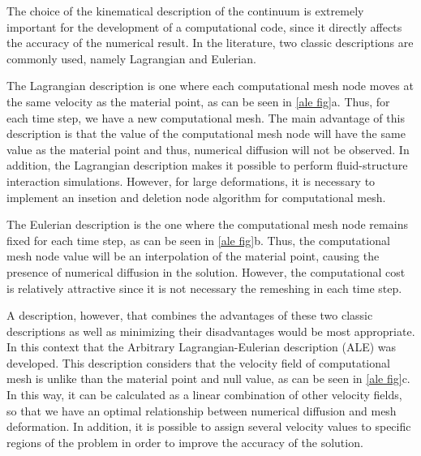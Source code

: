 The choice of the kinematical description of the continuum is 
extremely important for the development of a computational code, 
since it directly affects the accuracy of the numerical result. 
In the literature, two classic descriptions are commonly used, 
namely Lagrangian and Eulerian.

\medskip
The Lagrangian description is one where each computational mesh node 
moves at the same velocity as the material point, as can be seen in
\ref{ale fig}a. Thus, for each time step, we have a new computational mesh. 
The main advantage of this description is that the value of the 
computational mesh node will have the same value as the material point
 and thus, numerical diffusion will not be observed. In addition, 
the Lagrangian description makes it possible to perform 
fluid-structure interaction simulations. However, for large 
deformations, it is necessary to implement an insetion and deletion
node algorithm for computational mesh.

\medskip
The Eulerian description is the one where the computational mesh node 
remains fixed for each time step, as can be seen in \ref{ale fig}b.
Thus, the computational mesh node value will be an interpolation 
of the material point, causing the presence of numerical diffusion 
in the solution. However, the computational cost is relatively 
attractive since it is not necessary the remeshing in each time step.

\medskip
A description, however, that combines the advantages of these two 
classic descriptions as well as minimizing their disadvantages would be
most appropriate. In this context that the Arbitrary 
Lagrangian-Eulerian description (ALE) was developed. 
This description considers that the velocity field of computational 
mesh is unlike than the material point and null value, as can be seen 
in \ref{ale fig}c. In this way, it can be calculated as a 
linear combination of other velocity fields, so that we have an 
optimal relationship between numerical diffusion and mesh deformation. 
In addition, it is possible to assign several velocity values to 
specific regions of the problem in order to improve the 
accuracy of the solution.



